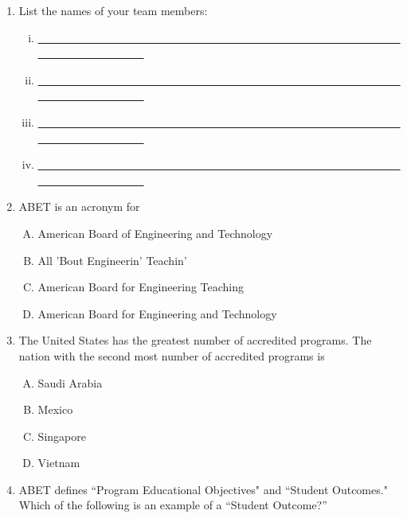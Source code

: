 \documentclass[11pt]{article}
\begin{document}


\begin{enumerate}
\item List the names of your team members:
\begin{enumerate}[(i)]
\item \underline{\ \ \ \ \ \ \ \ \ \ \ \ \ \ \ \ \ \ \ \ \ \ \ \ \ \ \ \ \ \ \ \ \ \ \ \ \ \ \ \ \ \ \ \ \ \ \ \ \ \ \ \ \ \ \ \ \ \ \ \ \ \ \ \ \ \ \ \ \ \ \ \ \ \ \ \ \ \ \ \ \ \ \ \ }
\item \underline{\ \ \ \ \ \ \ \ \ \ \ \ \ \ \ \ \ \ \ \ \ \ \ \ \ \ \ \ \ \ \ \ \ \ \ \ \ \ \ \ \ \ \ \ \ \ \ \ \ \ \ \ \ \ \ \ \ \ \ \ \ \ \ \ \ \ \ \ \ \ \ \ \ \ \ \ \ \ \ \ \ \ \ \ }
\item  \underline{\ \ \ \ \ \ \ \ \ \ \ \ \ \ \ \ \ \ \ \ \ \ \ \ \ \ \ \ \ \ \ \ \ \ \ \ \ \ \ \ \ \ \ \ \ \ \ \ \ \ \ \ \ \ \ \ \ \ \ \ \ \ \ \ \ \ \ \ \ \ \ \ \ \ \ \ \ \ \ \ \ \ \ \ }
\item \underline{\ \ \ \ \ \ \ \ \ \ \ \ \ \ \ \ \ \ \ \ \ \ \ \ \ \ \ \ \ \ \ \ \ \ \ \ \ \ \ \ \ \ \ \ \ \ \ \ \ \ \ \ \ \ \ \ \ \ \ \ \ \ \ \ \ \ \ \ \ \ \ \ \ \ \ \ \ \ \ \ \ \ \ \ }
\end{enumerate}
\item ABET is an acronym for
\begin{enumerate}[(A)]
\item American Board of Engineering and Technology
\item All 'Bout Engineerin' Teachin'
\item American Board for Engineering Teaching
\item American Board for Engineering and Technology
\end{enumerate}
\item The United States has the greatest number of accredited programs.  The nation with the second most number of accredited programs is
\begin{enumerate}[(A)]
\item Saudi Arabia
\item Mexico
\item Singapore
\item Vietnam
\end{enumerate}
\item ABET defines ``Program Educational Objectives" and ``Student Outcomes."  Which of the following is an example of a ``Student Outcome?''

\end{enumerate}
\end{document}
